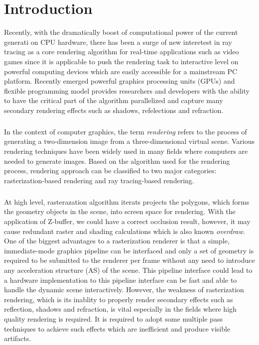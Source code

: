 
\chapter{Introduction}
Recently, with the dramatically boost of computational power of the current generati on CPU hardware, there has been a surge of new interetest in ray tracing as a core rendering algorithm for real-time applications such as video games since it is applicable to push the rendering task to interactive level on powerful computing devices which are easily accessible for a mainstream PC platform. Recently emerged powerful graphics processing units (GPUs) and flexible programming model provides researchers and developers with the ability to have the critical part of the algorithm parallelized and capture many secondary rendering effects such as shadows, refelections and refraction.


\paragraph{}
In the context of computer graphics, the term \emph{rendering} refers to the process of generating a two-dimension image from a three-dimensional virtual scene. Various rendering techniques have been widely used in many fields where computers are needed to generate images. Based on the algorithm used for the rendering process, rendering approach can be classified to two major categories: rasterization-based rendering and ray tracing-based rendering. 

\paragraph{}
At high level, rasterazation algorithm iterats projects the polygons, which forms the geometry objects in the scene, into screen space for rendering. With the application of Z-buffer, we could have a correct occlusion result, however, it may cause redundant raster and shading calculations which is also known \emph{overdraw}. One of the biggest advantages to a rasterization renderer is that a simple, immediate-mode graphics pipeline can be interfaced and only a set of geometry is required to be submitted to the renderer per frame without any need to introduce any acceleration structure (AS) of the scene. This pipeline interface could lead to a hardware implementation to this pipeline interface can be fast and able to handle the dynamic scene interactively. However, the weakness of rasterization rendering, which is its inablity to properly render secondary effects such as reflection, shadows and refraction, is vital especially in the fields where high quality rendering is required. It is required to adopt some multiple pass techniques to achieve such effects which are inefficient and produce visible artifacts. 

